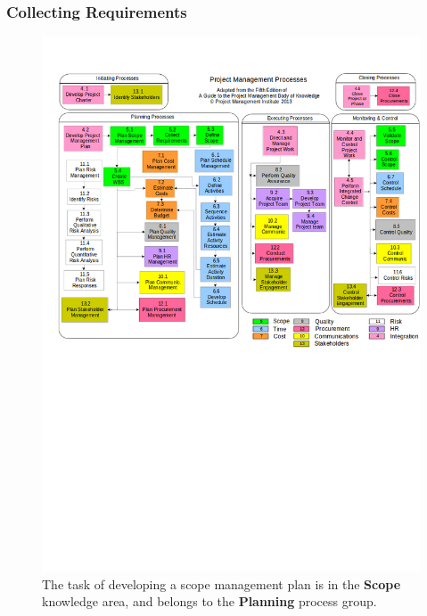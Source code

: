 \documentclass{beamer}
\begin{document}
\begin{frame}
\frametitle{Collecting Requirements}
\begin{figure}
\caption{The task of developing a scope management plan is in the \textbf{Scope} knowledge area, and belongs to the \textbf{Planning} process group.}
\vspace{-0.8cm}
\includegraphics[scale=0.3]{mapping}
\end{figure}
\end{frame}

\end{document}
